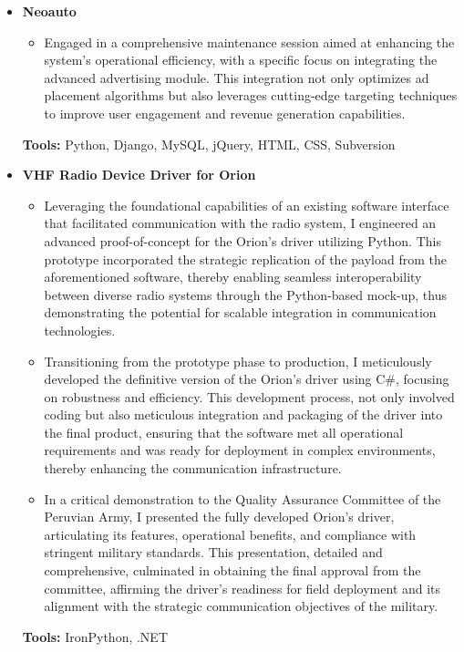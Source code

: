 \documentclass[11pt,a4paper,english]{moderncv}
\begin{document}
{
\begin{itemize}
    \item \textbf{Neoauto}
        \begin{itemize}
            \item Engaged in a comprehensive maintenance session aimed at enhancing the system's operational efficiency, with a specific focus on integrating the advanced advertising module. This integration not only optimizes ad placement algorithms but also leverages cutting-edge targeting techniques to improve user engagement and revenue generation capabilities.
        \end{itemize}
        \textbf{Tools:}  Python, Django, MySQL, jQuery, HTML, CSS, Subversion
    \item \textbf{VHF Radio Device Driver for Orion}
        \begin{itemize}
            \item Leveraging the foundational capabilities of an existing software interface that facilitated communication with the radio system, I engineered an advanced proof-of-concept for the Orion's driver utilizing Python. This prototype incorporated the strategic replication of the payload from the aforementioned software, thereby enabling seamless interoperability between diverse radio systems through the Python-based mock-up, thus demonstrating the potential for scalable integration in communication technologies.
            \item Transitioning from the prototype phase to production, I meticulously developed the definitive version of the Orion's driver using C\#, focusing on robustness and efficiency. This development process, not only involved coding but also meticulous integration and packaging of the driver into the final product, ensuring that the software met all operational requirements and was ready for deployment in complex environments, thereby enhancing the communication infrastructure.
            \item In a critical demonstration to the Quality Assurance Committee of the Peruvian Army, I presented the fully developed Orion's driver, articulating its features, operational benefits, and compliance with stringent military standards. This presentation, detailed and comprehensive, culminated in obtaining the final approval from the committee, affirming the driver’s readiness for field deployment and its alignment with the strategic communication objectives of the military.
        \end{itemize}
        \textbf{Tools:} IronPython, .NET
\end{itemize}
}
\end{document}
